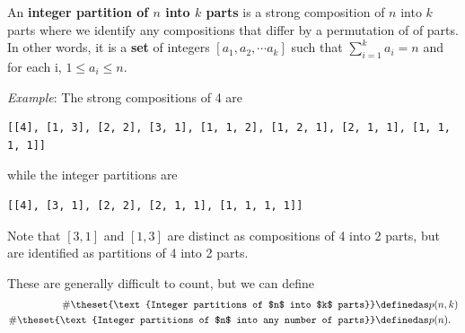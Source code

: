 An \textbf{integer partition of \(n\) into \(k\) parts} is a strong
composition of \(n\) into \(k\) parts where we identify any compositions
that differ by a permutation of of parts. In other words, it is a
\textbf{set} of integers \([a_1, a_2, \cdots a_k]\) such that
\(\sum_{i=1}^k a_i = n\) and for each i, \(1 \leq a_i \leq n\).

\emph{Example}: The strong compositions of 4 are

\begin{Shaded}
\begin{Highlighting}[]
  \OperatorTok{*}
\NormalTok{(}\NormalTok{(}\OperatorTok{=}\NormalTok{))}
\end{Highlighting}
\end{Shaded}

\begin{verbatim}
[[4], [1, 3], [2, 2], [3, 1], [1, 1, 2], [1, 2, 1], [2, 1, 1], [1, 1, 1, 1]]
\end{verbatim}

while the integer partitions are

\begin{Shaded}
\begin{Highlighting}[]
  \OperatorTok{*}
\NormalTok{(}\NormalTok{(}\OperatorTok{=}\NormalTok{))}
\end{Highlighting}
\end{Shaded}

\begin{verbatim}
[[4], [3, 1], [2, 2], [2, 1, 1], [1, 1, 1, 1]]
\end{verbatim}

Note that \([3,1]\) and \([1,3]\) are distinct as compositions of 4 into
2 parts, but are identified as partitions of 4 into 2 parts.

These are generally difficult to count, but we can define
\[\begin{aligned}
\# \theset{\text{Integer partitions of $n$ into $k$ parts}} &\definedas p(n, k) \\
\# \theset{\text{Integer partitions of $n$ into any number of parts}} &\definedas p(n).
\end{aligned}\]

